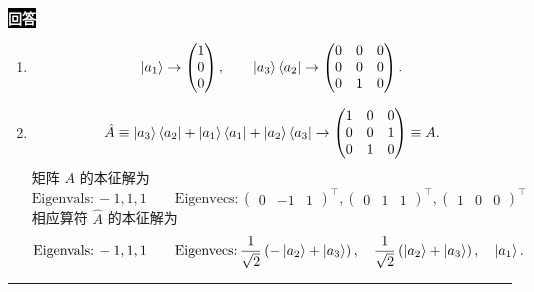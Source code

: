 \documentclass[11pt,a4paper]{ctexart}
\newenvironment{answer}
  {\par\smallskip\noindent
   \begingroup
   \setlength{\fboxsep}{4pt}%
   \colorbox{black}{\textcolor{white}{\bfseries 回答}}%
   \endgroup
   \quad\ignorespaces}
  {\par\smallskip\noindent\rule{\linewidth}{0.4pt}\medskip}
\begin{document}
\begin{answer}
  \begin{enumerate}
    \item 
      \begin{equation}
        \Ket{a_1 } \to 
        \begin{pmatrix}
        1 \\
        0 \\
        0
        \end{pmatrix},\qquad
        \Ket{a_3 }\Bra{a_2 } \to
        \begin{pmatrix}
        0 &0 &0 \\
        0 &0 &0 \\
        0 &1 &0
        \end{pmatrix}.
      \end{equation}
    \item 
      \begin{equation}
        \hat{A} \equiv 
        \Ket{a_3 }\Bra{a_2 } + \Ket{a_1 }\Bra{a_1 } + \Ket{a_2 }\Bra{a_3 } \to
        \begin{pmatrix}
          1 &0 &0 \\
          0 &0 &1 \\
          0 &1 &0
        \end{pmatrix}
        \equiv A.
      \end{equation}
      矩阵 $A$ 的本征解为
      \begin{equation}
        \text{Eigenvals:}\, -1,1,1\qquad
        \text{Eigenvecs:}\,
        \begin{pmatrix}
          0 &-1 &1
        \end{pmatrix}^\top,
        \begin{pmatrix}
          0 &1 &1
        \end{pmatrix}^\top,
        \begin{pmatrix}
          1 &0 &0
        \end{pmatrix}^\top
      \end{equation}
      相应算符 $\hat{A}$ 的本征解为
      \begin{equation}
        \text{Eigenvals:}\, -1,1,1\qquad
        \text{Eigenvecs:}\,
        \frac{1 }{\sqrt{2} } \left(-\Ket{a_2 } + \Ket{a_3 } \right),\quad
        \frac{1 }{\sqrt{2} } \left(\Ket{a_2 } + \Ket{a_3 } \right),\quad
        \Ket{a_1 }.
      \end{equation}
  \end{enumerate}
\end{answer}
\end{document}
